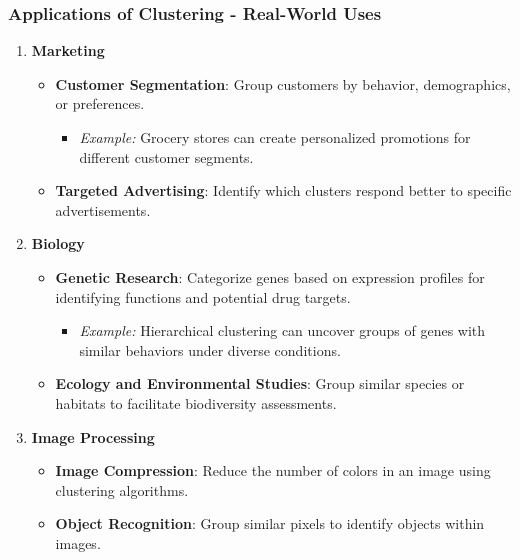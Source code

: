 \documentclass[aspectratio=169]{beamer}
\begin{document}
\begin{frame}[fragile]
    \frametitle{Applications of Clustering - Real-World Uses}

    \begin{enumerate}
        \item \textbf{Marketing}
        \begin{itemize}
            \item \textbf{Customer Segmentation}: Group customers by behavior, demographics, or preferences.
              \begin{itemize}
                  \item \textit{Example:} Grocery stores can create personalized promotions for different customer segments.
              \end{itemize}
            \item \textbf{Targeted Advertising}: Identify which clusters respond better to specific advertisements.
        \end{itemize}
        
        \item \textbf{Biology}
        \begin{itemize}
            \item \textbf{Genetic Research}: Categorize genes based on expression profiles for identifying functions and potential drug targets.
              \begin{itemize}
                  \item \textit{Example:} Hierarchical clustering can uncover groups of genes with similar behaviors under diverse conditions.
              \end{itemize}
            \item \textbf{Ecology and Environmental Studies}: Group similar species or habitats to facilitate biodiversity assessments.
        \end{itemize}
        
        \item \textbf{Image Processing}
        \begin{itemize}
            \item \textbf{Image Compression}: Reduce the number of colors in an image using clustering algorithms.
            \item \textbf{Object Recognition}: Group similar pixels to identify objects within images.
        \end{itemize}
    \end{enumerate}
\end{frame}
\end{document}
